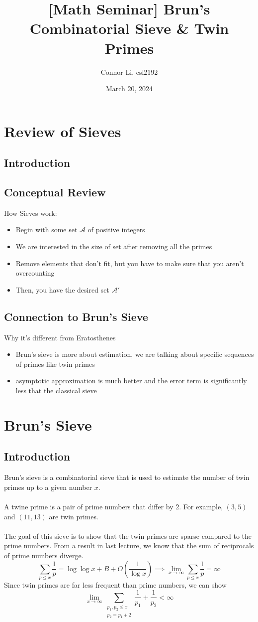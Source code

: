 \documentclass[8pt]{extarticle}
\title{[Math Seminar] Brun's Combinatorial Sieve \& Twin Primes}
\author{Connor Li, csl2192}
\date{March 20, 2024}
\begin{document}
\maketitle
\section{Review of Sieves}
\subsection{Introduction}
\subsection{Conceptual Review}
How Sieves work:
\begin{itemize}
    \item Begin with some set $\mathcal{A}$ of positive integers
    \item We are interested in the size of set after removing all the primes
    \item Remove elements that don't fit, but you have to make sure that you aren't overcounting
    \item Then, you have the desired set $\mathcal{A}'$
\end{itemize}
\subsection{Connection to Brun's Sieve}
Why it's different from Eratosthenes
\begin{itemize}
    \item Brun's sieve is more about estimation, we are talking about specific sequences of primes like twin primes
    \item asymptotic approximation is much better and the error term is significantly less that the classical sieve
\end{itemize}
\pagebreak
\section{Brun's Sieve}
\subsection{Introduction}
Brun's sieve is a combinatorial sieve that is used to estimate the number of twin primes up to a given number $x$. \\
\\
A twine prime is a pair of prime numbers that differ by $2$. For example, $(3,5)$ and $(11,13)$ are twin primes. \\
\\
The goal of this sieve is to show that the twin primes are sparse compared to the prime numbers. From a result in last lecture, we know that the sum of reciprocals of prime numbers diverge.
$$
\sum_{p \leq x} \frac{1}{p} = \log \log x + B + O\left(\frac{1}{\log x}\right) \implies \lim_{x\rightarrow\infty} \sum_{p \leq x} \frac{1}{p} = \infty
$$
Since twin primes are far less frequent than prime numbers, we can show 
$$
\lim_{x\rightarrow \infty} \sum_{\substack{p_1, p_2 \leq x \\ p_2 = p_1 + 2}} \frac{1}{p_1} + \frac{1}{p_2} < \infty
$$
\end{document}

